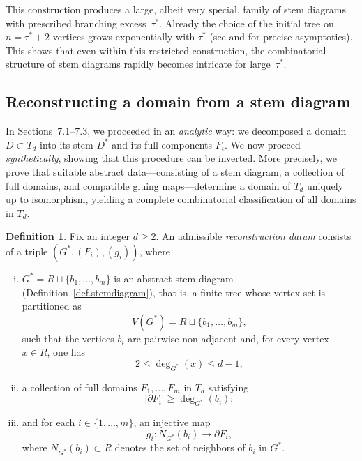 \documentclass[a4paper, 11pt]{article}
\numberwithin{equation}{section}
\theoremstyle{definition}
\newtheorem{definition}[theorem]{Definition}
\theoremstyle{remark}
\begin{document}
\smallskip 

This construction produces a large, albeit very special, family of stem diagrams with prescribed branching excess~$\tau^*$.
Already the choice of the initial tree on $n= \tau^*+2$ vertices 
grows exponentially with $\tau^*$ (see \cite{Otter1948} and \cite[Chapter~3]{Drmota2009} for precise asymptotics).
This shows that even within this restricted construction,
the combinatorial structure of stem diagrams rapidly becomes intricate for large~$\tau^*$.

\subsection{Reconstructing a domain from a stem diagram}
\label{sec.reconstruction}

In Sections~7.1--7.3, we proceeded in an \textit{analytic} way: we 
decomposed a domain $D \subset T_d$ into its stem $D^*$ and its full 
components $F_i$. We now proceed \textit{synthetically}, showing that 
this procedure can be inverted. More precisely, we prove that suitable 
abstract data---consisting of a stem diagram, a collection of full 
domains, and compatible gluing maps---determine a domain of $T_d$ 
uniquely up to isomorphism, yielding a complete combinatorial classification of all domains in $T_d$.
 
\medskip  

\begin{definition} \label{def.ARD}
Fix an integer $d \ge 2$. An admissible \emph{reconstruction datum} consists of a triple $(G^*, (F_i), (g_i))$, where 
\begin{enumerate}[(i)]
\item $G^* = R \sqcup \{b_1, \dots, b_m\}$ is an abstract stem diagram (Definition~\ref{def.stemdiagram}), that is, a finite tree whose vertex set is partitioned as
\[
V(G^*) = R \sqcup \{b_1, \dots, b_m\},
\]
such that the vertices $b_i$ are pairwise non-adjacent and, for every vertex $x \in R$, one has
\[
2 \le \deg_{G^*}(x) \le d-1,
\]

\item a collection of full domains $F_1, \dots, F_m$ in $T_d$ satisfying
\[
|\partial F_i| \ge \deg_{G^*}(b_i);
\]

\item and for each $i \in \{1, \dots, m\}$, an injective map
\[
g_i : N_{G^*}(b_i) \to \partial F_i,
\]
where $N_{G^*}(b_i) \subset R$ denotes the set of neighbors of $b_i$ in $G^*$.
\end{enumerate} 
\end{definition}
\end{document}
